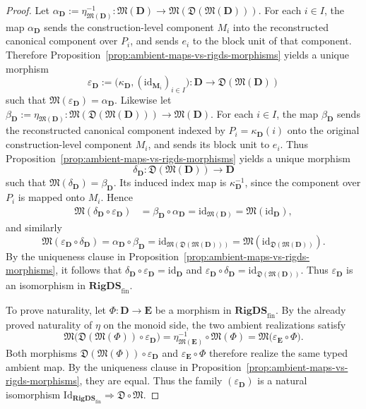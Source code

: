 \documentclass[pdflatex,sn-mathphys-num]{sn-jnl}
\theoremstyle{thmstyleone}%
\theoremstyle{thmstyletwo}%
\theoremstyle{thmstylethree}%
\begin{document}
\begin{proof}
Let \(\alpha_{\mathbf D}:=\eta_{\mathfrak M(\mathbf D)}^{-1}\colon \mathfrak M(\mathbf D)\to \mathfrak M(\mathfrak D(\mathfrak M(\mathbf D)))\).
For each \(i\in I\), the map \(\alpha_{\mathbf D}\) sends the construction-level component \(M_i\) into the reconstructed canonical component over \(P_i\), and sends \(e_i\) to the block unit of that component.
Therefore Proposition~\ref{prop:ambient-maps-vs-rigds-morphisms} yields a unique morphism
\[
\varepsilon_{\mathbf D}:=
\bigl(\kappa_{\mathbf D},(\mathrm{id}_{\mathbf M_i})_{i\in I}\bigr)
\colon \mathbf D\to \mathfrak D(\mathfrak M(\mathbf D))
\]
such that \(\mathfrak M(\varepsilon_{\mathbf D})=\alpha_{\mathbf D}\).
Likewise let \(\beta_{\mathbf D}:=\eta_{\mathfrak M(\mathbf D)}\colon \mathfrak M(\mathfrak D(\mathfrak M(\mathbf D)))\to \mathfrak M(\mathbf D)\).
For each \(i\in I\), the map \(\beta_{\mathbf D}\) sends the reconstructed canonical component indexed by \(P_i=\kappa_{\mathbf D}(i)\) onto the original construction-level component \(M_i\), and sends its block unit to \(e_i\).
Thus Proposition~\ref{prop:ambient-maps-vs-rigds-morphisms} yields a unique morphism
\[
\delta_{\mathbf D}\colon \mathfrak D(\mathfrak M(\mathbf D))\to \mathbf D
\]
such that \(\mathfrak M(\delta_{\mathbf D})=\beta_{\mathbf D}\).
Its induced index map is \(\kappa_{\mathbf D}^{-1}\), since the component over \(P_i\) is mapped onto \(M_i\).
Hence
\begin{align*}
\mathfrak M(\delta_{\mathbf D}\circ \varepsilon_{\mathbf D})
&=\beta_{\mathbf D}\circ\alpha_{\mathbf D}
 =\mathrm{id}_{\mathfrak M(\mathbf D)}
 =\mathfrak M(\mathrm{id}_{\mathbf D}),
\end{align*}
and similarly
\[
\mathfrak M(\varepsilon_{\mathbf D}\circ \delta_{\mathbf D})
=\alpha_{\mathbf D}\circ\beta_{\mathbf D}
=\mathrm{id}_{\mathfrak M(\mathfrak D(\mathfrak M(\mathbf D)))}
=\mathfrak M(\mathrm{id}_{\mathfrak D(\mathfrak M(\mathbf D))}).
\]
By the uniqueness clause in Proposition~\ref{prop:ambient-maps-vs-rigds-morphisms}, it follows that \(\delta_{\mathbf D}\circ \varepsilon_{\mathbf D}=\mathrm{id}_{\mathbf D}\) and \(\varepsilon_{\mathbf D}\circ \delta_{\mathbf D} =\mathrm{id}_{\mathfrak D(\mathfrak M(\mathbf D))}\).
Thus \(\varepsilon_{\mathbf D}\) is an isomorphism in \(\mathbf{RigDS}_{\mathrm{fin}}\).

To prove naturality, let \(\Phi\colon \mathbf D\to \mathbf E\) be a morphism in \(\mathbf{RigDS}_{\mathrm{fin}}\).
By the already proved naturality of \(\eta\) on the monoid side, the two ambient realizations satisfy
\[
\mathfrak M\bigl(\mathfrak D(\mathfrak M(\Phi))\circ \varepsilon_{\mathbf D}\bigr)
=
\eta_{\mathfrak M(\mathbf E)}^{-1}\circ \mathfrak M(\Phi)
=
\mathfrak M\bigl(\varepsilon_{\mathbf E}\circ \Phi\bigr).
\]
Both morphisms \(\mathfrak D(\mathfrak M(\Phi))\circ \varepsilon_{\mathbf D}\) and \(\varepsilon_{\mathbf E}\circ \Phi\) therefore realize the same typed ambient map.
By the uniqueness clause in Proposition~\ref{prop:ambient-maps-vs-rigds-morphisms}, they are equal.
Thus the family \((\varepsilon_{\mathbf D})\) is a natural isomorphism \(\mathrm{Id}_{\mathbf{RigDS}_{\mathrm{fin}}}\Rightarrow \mathfrak D\circ \mathfrak M\).


\end{proof}
\end{document}
